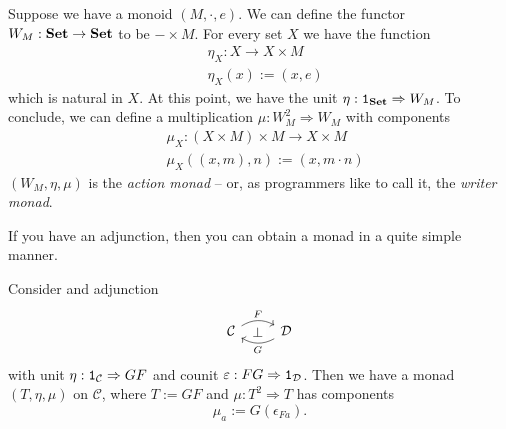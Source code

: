 \begin{example}\label{example:ActionWriterMonad}
  Suppose we have a monoid \((M, \cdot, e)\). We can define the functor \(W_M : \mathbf{Set}
  \to \mathbf{Set}\) to be \(- \times M\). For every set \(X\) we have the function
  \begin{align*}
    & \eta_X : X \to X \times M \\
    & \eta_X(x) := (x, e)
  \end{align*}
  which is natural in \(X\). At this point, we have the unit \(\eta :
  \mathtt 1_{\mathbf{Set}} \Rightarrow W_M\). To conclude, we can define a multiplication \(\mu :
  W_M^2 \Rightarrow W_M\) with components
  \begin{align*}
    & \mu_X : (X \times M) \times M \to X \times M \\
    & \mu_X ((x, m), n) := (x, m \cdot n)
  \end{align*}
  \((W_M, \eta, \mu)\) is the {\em action monad} -- or, as programmers like to
  call it, the {\em writer monad}.
\end{example}

If you have an adjunction, then you can obtain a monad in a quite simple manner.

\begin{proposition}\label{proposition:FromAdjunctionsToMonads}
  Consider and adjunction
  \[
    \begin{tikzcd}
      \mathcal{C} \ar["{F}"{name=left}, r, bend left] & \mathcal{D} \ar["{G}"{name=right},
      l, bend left] \ar["{\perp}"description, phantom, from=left, to=right]
    \end{tikzcd}
  \]
  with unit \(\eta : \mathtt 1_{\mathcal{C}} \Rightarrow G F\) and counit
  \(\varepsilon : F G \Rightarrow \mathtt 1_{\mathcal{D}}\). Then we have a monad
  \((T, \eta, \mu)\) on \(\mathcal{C}\), where \(T := GF\) and
  \(\mu : T^2 \Rightarrow T\) has components
  \[
    \mu_a := G \left( \epsilon_{Fa} \right) .
  \]
\end{proposition}

